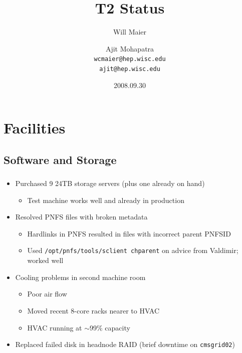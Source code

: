 \documentclass{beamer}
\title{T2 Status}
\author[Maier, Mohapatra]{
    Will Maier \and Ajit Mohapatra\\ 
    {\tt wcmaier@hep.wisc.edu}\\
    {\tt ajit@hep.wisc.edu}}
\institute[Wisconsin]{University of Wisconsin - High Energy Physics}
\date{2008.09.30}
\newcommand{\ca}{\ensuremath{\sim}}
\begin{document}
\begin{frame}
    \titlepage
\end{frame}


\section{Facilities}
\subsection{Software and Storage}
\begin{frame}
\frametitle{}
\begin{itemize}
    \item Purchased 9 24TB storage servers (plus one already on hand)
    \begin{itemize}
        \item Test machine works well and already in production
    \end{itemize}
    \item Resolved PNFS files with broken metadata
    \begin{itemize}
        \item Hardlinks in PNFS resulted in files with incorrect parent PNFSID
        \item Used {\tt /opt/pnfs/tools/sclient chparent} on advice from Valdimir; worked well
    \end{itemize}
    \item Cooling problems in second machine room
    \begin{itemize}
        \item Poor air flow
        \item Moved recent 8-core racks nearer to HVAC
        \item HVAC running at \ca{}99\% capacity
    \end{itemize}
    \item Replaced failed disk in headnode RAID (brief downtime on {\tt cmsgrid02})
\end{itemize}
\end{frame}
\end{document}
